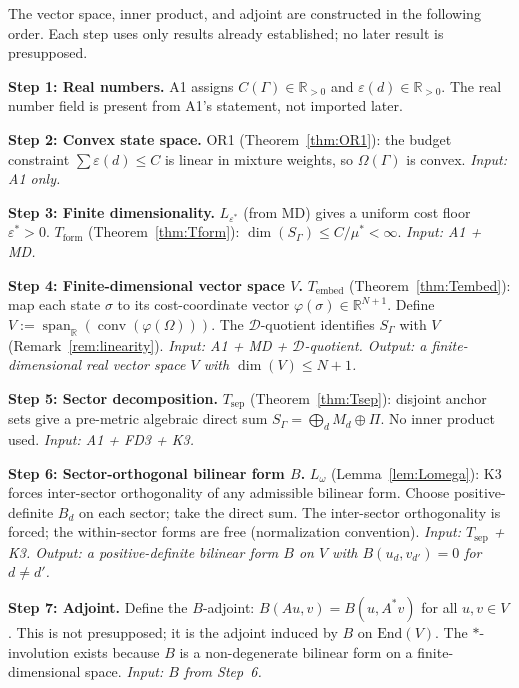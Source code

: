 \documentclass[11pt,a4paper]{article}
\theoremstyle{definition}
\newcommand{\eps}{\varepsilon}
\newcommand{\End}{\mathrm{End}}
\DeclareMathOperator{\spn}{span}
\DeclareMathOperator{\conv}{conv}
\begin{document}
\begin{tcolorbox}[apfbox, title={How the pre-algebraic structure arises from A1+MD+BW (no forward references)}]
The vector space, inner product, and adjoint are constructed in the following order.  Each step uses only results already established; no later result is presupposed.

\smallskip
\noindent\textbf{Step 1: Real numbers.}  A1 assigns $C(\Gamma) \in \mathbb{R}_{>0}$ and $\eps(d) \in \mathbb{R}_{>0}$.  The real number field is present from A1's statement, not imported later.

\smallskip
\noindent\textbf{Step 2: Convex state space.}  OR1 (Theorem~\ref{thm:OR1}): the budget constraint $\sum \eps(d) \le C$ is linear in mixture weights, so $\Omega(\Gamma)$ is convex.  \textit{Input: A1 only.}

\smallskip
\noindent\textbf{Step 3: Finite dimensionality.}  $L_{\eps^*}$ (from MD) gives a uniform cost floor $\eps^* > 0$.  $T_{\mathrm{form}}$ (Theorem~\ref{thm:Tform}): $\dim(S_\Gamma) \le C/\mu^* < \infty$.  \textit{Input: A1 + MD.}

\smallskip
\noindent\textbf{Step 4: Finite-dimensional vector space $V$.}  $T_{\mathrm{embed}}$ (Theorem~\ref{thm:Tembed}): map each state $\sigma$ to its cost-coordinate vector $\varphi(\sigma) \in \mathbb{R}^{N+1}$.  Define $V := \spn_\mathbb{R}(\conv(\varphi(\Omega)))$.  The $\mathcal{D}$-quotient identifies $S_\Gamma$ with $V$ (Remark~\ref{rem:linearity}).  \textit{Input: A1 + MD + $\mathcal{D}$-quotient.  Output: a finite-dimensional real vector space $V$ with $\dim(V) \le N+1$.}

\smallskip
\noindent\textbf{Step 5: Sector decomposition.}  $T_{\mathrm{sep}}$ (Theorem~\ref{thm:Tsep}): disjoint anchor sets give a pre-metric algebraic direct sum $S_\Gamma = \bigoplus_d M_d \oplus \Pi$.  No inner product used.  \textit{Input: A1 + FD3 + K3.}

\smallskip
\noindent\textbf{Step 6: Sector-orthogonal bilinear form $B$.}  $L_\omega$ (Lemma~\ref{lem:Lomega}): K3 forces inter-sector orthogonality of any admissible bilinear form.  Choose positive-definite $B_d$ on each sector; take the direct sum.  The inter-sector orthogonality is forced; the within-sector forms are free (normalization convention).  \textit{Input: $T_{\mathrm{sep}}$ + K3.  Output: a positive-definite bilinear form $B$ on $V$ with $B(u_d, v_{d'}) = 0$ for $d \ne d'$.}

\smallskip
\noindent\textbf{Step 7: Adjoint.}  Define the $B$-adjoint: $B(Au, v) = B(u, A^*v)$ for all $u, v \in V$.  This is not presupposed; it is the adjoint induced by $B$ on $\End(V)$.  The $*$-involution exists because $B$ is a non-degenerate bilinear form on a finite-dimensional space.  \textit{Input: $B$ from Step~6.}


\end{tcolorbox}
\end{document}
